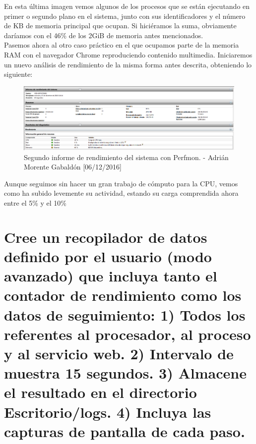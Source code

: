 En esta última imagen vemos algunos de los procesos que se están ejecutando en primer o segundo plano en el sistema, junto con sus identificadores y el número de KB de memoria principal que ocupan. Si hiciéramos la suma, obviamente daríamos con el 46\% de los 2GiB de memoria antes mencionados. \\
Pasemos ahora al otro caso práctico en el que ocupamos parte de la memoria RAM con el navegador Chrome reproduciendo contenido multimedia. Iniciaremos un nuevo análisis de rendimiento de la misma forma antes descrita, obteniendo lo siguiente:
\begin{figure}[H]
	\centering
	\includegraphics[scale=0.6]{perfmon-3}
	\caption{Segundo informe de rendimiento del sistema con Perfmon. - Adrián Morente Gabaldón [06/12/2016]}
	\label{figura11}
\end{figure}
Aunque seguimos sin hacer un gran trabajo de cómputo para la CPU, vemos como ha subido levemente su actividad, estando su carga comprendida ahora entre el 5\% y el 10\%


\section{Cree un recopilador de datos definido por el usuario (modo avanzado) que incluya tanto el contador de rendimiento como los datos de seguimiento: 1) Todos los referentes al procesador, al proceso y al servicio web. 2) Intervalo de muestra 15 segundos. 3) Almacene el resultado en el directorio Escritorio/logs. 4) Incluya las capturas de pantalla de cada paso.}

